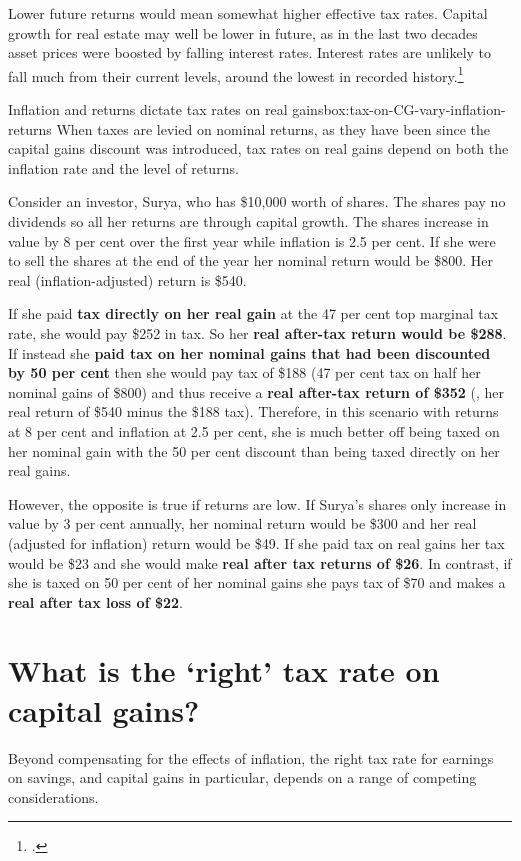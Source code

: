 Lower future returns would mean somewhat higher effective tax rates. Capital growth for real estate may well be lower in future, as in the last two decades asset prices were boosted by falling interest rates. Interest rates are unlikely to fall much from their current levels, around the lowest in recorded history.\footcite[][19]{Haldane2015}

\begin{smallbox}{Inflation and returns dictate tax rates on real gains}{box:tax-on-CG-vary-inflation-returns}
\addtolength{\parskip}{3pt}
When taxes are levied on nominal returns, as they have been since the capital gains discount was introduced, tax rates on real gains depend on both the inflation rate and the level of returns. 

Consider an investor, Surya, who has \$10,000 worth of shares. The shares pay no dividends so all her returns are through capital growth. The shares increase in value by 8 per cent over the first year while inflation is 2.5 per cent. If she were to sell the shares at the end of the year her nominal return would be \$800. Her real (inflation-adjusted) return is \$540. 

If she paid \textbf{tax directly on her real gain} at the 47 per cent top marginal tax rate, she would pay \$252 in tax. So her \textbf{real after-tax return would be \$288}. If instead she \textbf{paid tax on her nominal gains that had been discounted by 50 per cent} then she would pay tax of \$188 (47 per cent tax on half her nominal gains of \$800) and thus receive a \textbf{real after-tax return of \$352} (\ie, her real return of \$540 minus the \$188 tax). Therefore, in this scenario with returns at 8 per cent and inflation at 2.5 per cent, she is much better off being taxed on her nominal gain with the 50 per cent discount than being taxed directly on her real gains. 

However, the opposite is true if returns are low. If Surya’s shares only increase in value by 3 per cent annually, her nominal return would be \$300 and her real (adjusted for inflation) return would be \$49. If she paid tax on real gains her tax would be \$23 and she would make \textbf{real after tax returns of \$26}. In contrast, if she is taxed on 50 per cent of her nominal gains she pays tax of \$70 and makes a \textbf{real after tax loss of \$22}.
\end{smallbox}



\section{What is the `right' tax rate on capital gains?}\label{sec:What-is-the-right-tax-rate-on-capital-gains}
Beyond compensating for the effects of inflation, the right tax rate for earnings on savings, and capital gains in particular, depends on a range of competing considerations. 

